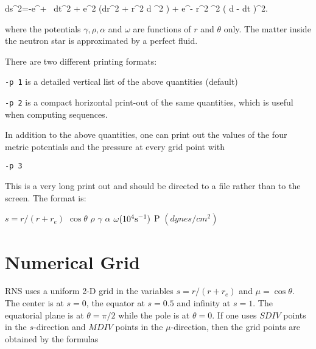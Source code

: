 \bee ds^2=-e^{\gamma+ \rho} \ dt^2 + e^{2 \alpha} \bigl(dr^2 + r^2 d \theta^2 
          \bigr) + e^{\gamma - \rho} r^2 \sin^2 \theta \bigl( d \phi - \omega dt
          \bigr)^2. \ee

\<where the potentials $\gamma, \rho, \alpha$ and $\omega$ are functions of 
$r$ and 
$\theta$ only. The matter inside the neutron star is approximated by a perfect 
fluid.
 
\vspace{3.5cm}

There are two different printing formats:

\begin{description}

\item{{\tt -p 1} is a detailed vertical list of the above quantities (default)}
\item{{\tt -p 2} is a compact horizontal print-out of the same quantities,
                 which is useful when computing sequences}.
\end{description}

\<In addition to the above quantities, one can print out the values of the
four metric potentials and the pressure at every grid point with

\vspace{0.2cm}
  
{\tt -p 3}

\vspace{0.2cm}

\<This is a very long print out and should be directed to a file rather than to
the screen. The format is:

\vspace{0.2cm}

 $s=r/(r+r_e)$ \hspace{0.6cm} $\cos \theta$ \hspace{0.6cm} $\rho$ \hspace{0.6cm} 
$\gamma$ \hspace{0.6cm} $\alpha$ \hspace{0.6cm} $\omega (10^4 {\rm s^{-1}})$ 
\hspace{0.6cm}  P $(dynes/cm^2)$

\section{Numerical Grid}

\<RNS uses a uniform 2-D grid in the variables $s=r/(r+r_e)$ and $\mu=
 \cos \theta$. The center is at $s=0$, the equator at $s=0.5$ and infinity at
$s=1$. The equatorial plane is at $\theta=\pi/2$ while the pole is at $\theta=0$.
If one uses $SDIV$ points in the $s$-direction and $MDIV$ points in the 
$\mu$-direction, then the grid points are obtained by the formulas


